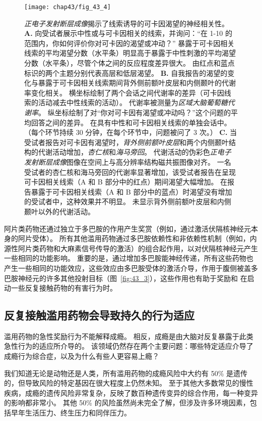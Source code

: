 \begin{figure}[htbp]
	\centering
	\texttt{[image: chap43/fig\_43\_4]}
	\caption{\textit{正电子发射断层成像}揭示了线索诱导的可卡因渴望的神经相关性\cite{grant1996activation}。
		\textbf{A.} 向受试者展示中性或与可卡因相关的线索，并询问：“在 1-10 的范围内，你如何评价你对可卡因的渴望或冲动？” 
		暴露于可卡因相关线索的平均渴望分数（水平条）明显高于暴露于中性刺激的平均渴望分数（水平条），尽管个体之间的反应程度差异很大。
		由红点和蓝点标识的两个主题分别代表高层和低层渴望。
		\textbf{B.} 自我报告的渴望的变化与暴露于可卡因相关线索期间背外侧前额叶皮层和内侧颞叶的代谢率变化相关。
		横坐标绘制了两个会话之间代谢率的差异（可卡因线索的活动减去中性线索的活动）。
		代谢率被测量为\textit{区域大脑葡萄糖代谢率}。
		纵坐标绘制了对“你对可卡因有渴望或冲动吗？”这个问题的平均回答之间的差异。
		在具有中性和可卡因相关线索的单独会话中。
		（每个环节持续 30 分钟，在每个环节中，问题被问了 3 次。）
		\textbf{C.} 当受试者报告对可卡因有渴望时，\textit{背外侧前额叶皮层}和两个内侧颞叶结构的代谢活动增加，\textit{杏仁核}和\textit{海马旁回}。
		代谢活动的伪彩色\textit{正电子发射断层成像}图像在空间上与高分辨率结构磁共振图像对齐。
		一名受试者的杏仁核和海马旁回的代谢率显著增加，该受试者报告在呈现可卡因相关线索（A 和 B 部分中的红点）期间渴望大幅增加。
		在报告暴露于可卡因相关线索（A 和 B 部分中的蓝点）时渴望没有增加的受试者中，这种效果并不明显。
		未显示背外侧前额叶皮层和内侧颞叶以外的代谢活动。}
	\label{fig:43_4}
\end{figure}


阿片类药物还通过独立于多巴胺的作用产生奖赏（例如，通过激活伏隔核神经元本身的阿片受体）。
所有其他滥用药物通过多巴胺依赖性和非依赖性机制（例如，内源性阿片类药物和大麻素信号传导的激活）的组合起作用，以对伏隔核神经元产生一些相同的功能影响。
重要的是，通过增加多巴胺能神经传递，所有这些药物也产生一些相同的功能效应，这些效应由多巴胺受体的激活介导，作用于腹侧被盖多巴胺神经元的许多其他投射目标（图~\ref{fig:43_3}），这些作用也有助于奖励和 在启动一些反复接触药物的有害行为时。



\subsection{反复接触滥用药物会导致持久的行为适应}

滥用药物的急性奖励行为不能解释成瘾。
相反，成瘾是由大脑对反复暴露于此类急性行为的适应所介导的。
该领域仍然存在两个主要问题：哪些特定适应介导了成瘾行为综合症，以及为什么有些人更容易上瘾？


我们知道无论是动物还是人类，所有滥用药物的成瘾风险中大约有 50\% 是遗传的，但导致风险的特定基因在很大程度上仍然未知。
至于其他大多数常见的慢性疾病，成瘾的遗传风险非常复杂，反映了数百种遗传变异的综合作用，每一种变异的影响都非常小。
其他 50\% 的风险虽然尚未完全了解，但涉及许多环境因素，包括早年生活压力、终生压力和同伴压力。


